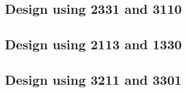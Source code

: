 
 \begin{center}




 \end{center}



\subsection{Design using 2331 and 3110}


 \begin{center}




 \end{center}



\subsection{Design using 2113 and 1330}


 \begin{center}




 \end{center}



\subsection{Design using 3211 and 3301}


